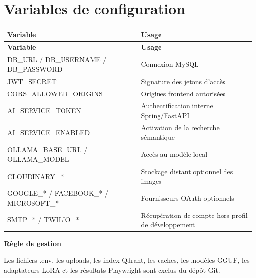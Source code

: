 \chapter{Variables de configuration}

{\small\singlespacing{}
\begin{longtable}{|>{\raggedright\arraybackslash}p{}|>{\raggedright\arraybackslash}p{}|}
\hline
\rowcolor{tablehead} \color{white}\bfseries Variable & \color{white}\bfseries Usage \\ \hline
\endfirsthead
\rowcolor{tablehead} \color{white}\bfseries Variable & \color{white}\bfseries Usage \\ \hline
\endhead
\hline\endfoot
DB\_URL / DB\_USERNAME / DB\_PASSWORD & Connexion MySQL \\ \hline
\rowcolor{tablerow} JWT\_SECRET & Signature des jetons d'accès \\ \hline
CORS\_ALLOWED\_ORIGINS & Origines frontend autorisées \\ \hline
\rowcolor{tablerow} AI\_SERVICE\_TOKEN & Authentification interne Spring/FastAPI \\ \hline
AI\_SERVICE\_ENABLED & Activation de la recherche sémantique \\ \hline
\rowcolor{tablerow} OLLAMA\_BASE\_URL / OLLAMA\_MODEL & Accès au modèle local \\ \hline
CLOUDINARY\_* & Stockage distant optionnel des images \\ \hline
\rowcolor{tablerow} GOOGLE\_* / FACEBOOK\_* / MICROSOFT\_* & Fournisseurs OAuth optionnels \\ \hline
SMTP\_* / TWILIO\_* & Récupération de compte hors profil de développement \\ \hline
\end{longtable}
}


\textbf{Règle de gestion}

Les fichiers .env, les uploads, les index Qdrant, les caches, les modèles GGUF, les adaptateurs LoRA et les résultats Playwright sont exclus du dépôt Git.
